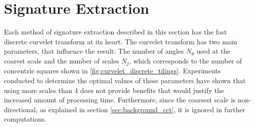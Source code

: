 \begin{figure}[h]
    \centering
    \quad
    \quad
    \quad
    \caption[Image aquisition variants]{
    }
    \label{fig:input_examples}
\end{figure}

\section{Signature Extraction}

Each method of signature extraction described in this section has the fast
discrete curvelet transform at its heart. The curvelet transform has two main
parameters, that influence the result: The number of angles $N_{\theta}$ used
at the coarest scale and the number of scales $N_j$, which corresponds to the
number of concentric squares shown in \ref{fig:curvelet_discrete_tilings}.
Experiments conducted to determine the optimal values of these parameters have
shown that using more scales than 4 does not provide benefits that would
justify the increased amount of processing time. Furthermore, since the
coarsest scale is non-directional, as explained in section
\ref{sec:background_cct}, it is ignored in further computations.


